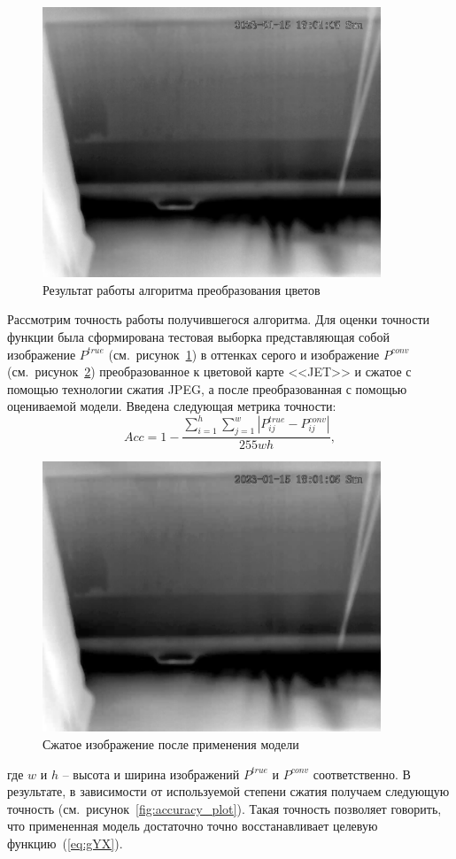 \documentclass[14pt, a4paper]{extreport}
\begin{document}
	\begin{figure}[h!]
		\centering
		\includegraphics[width = 0.9\textwidth, height = 0.475\textwidth]{image/chapter_2/gray_tep_example}
		\vspace*{-0.2cm}	
		\caption{Результат работы алгоритма преобразования цветов}
		\label{fig:grey1}
		\vspace*{0.4cm}
	\end{figure}
	Рассмотрим точность работы получившегося алгоритма. Для оценки точности функции была сформирована тестовая выборка представляющая собой изображение $P^{true}$ (см.~рисунок~\ref{fig:grey1}) в оттенках серого и изображение $P^{conv}$ (см.~рисунок~\ref{fig:grey2}) преобразованное к цветовой карте <<JET>> и сжатое с помощью технологии сжатия JPEG, а после преобразованная с помощью оцениваемой модели. Введена следующая метрика точности:
	\begin{equation}
		Acc = 1 - \frac{\sum\limits_{i=1}^h \sum\limits_{j=1}^w |P^{true}_{ij} - P^{conv}_{ij}|}{255wh},
		\label{eq:flanaccuracy}
	\end{equation}
	\begin{figure}[h!]
		\centering
		\includegraphics[width = 0.9\textwidth, height = 0.475\textwidth]{image/chapter_2/grey2}
		\vspace*{-0.2cm}
		\caption{Сжатое изображение после применения модели}
		\label{fig:grey2}
	\end{figure}
	\hspace{-0.15cm}где $w$ и $h$ -- высота и ширина изображений $P^{true}$ и $P^{conv}$ соответственно. В результате, в зависимости от используемой степени сжатия получаем следующую точность (см.~рисунок~\ref{fig:accuracy_plot}). Такая точность позволяет говорить, что примененная модель достаточно точно восстанавливает целевую функцию~(\ref{eq:gYX}).
	
\end{document}
